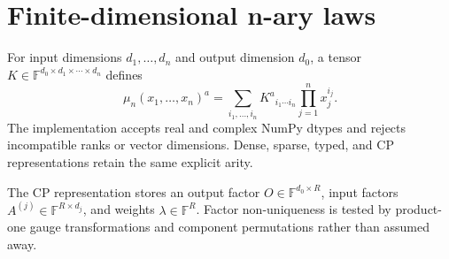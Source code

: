 \section{Finite-dimensional n-ary laws}

For input dimensions $d_1,\ldots,d_n$ and output dimension $d_0$, a tensor $K\in\mathbb F^{d_0\times d_1\times\cdots\times d_n}$ defines
\[
\mu_n(x_1,\ldots,x_n)^a=\sum_{i_1,\ldots,i_n}K^a{}_{i_1\cdots i_n}\prod_{j=1}^n x_j^{i_j}.
\]
The implementation accepts real and complex NumPy dtypes and rejects incompatible ranks or vector dimensions. Dense, sparse, typed, and CP representations retain the same explicit arity.

The CP representation stores an output factor $O\in\mathbb F^{d_0\times R}$, input factors $A^{(j)}\in\mathbb F^{R\times d_j}$, and weights $\lambda\in\mathbb F^R$. Factor non-uniqueness is tested by product-one gauge transformations and component permutations rather than assumed away.

